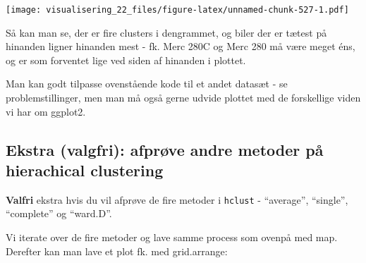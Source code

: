\documentclass[
]{book}
\newenvironment{Shaded}{\begin{snugshade}}{\end{snugshade}}
\newcommand{\AttributeTok}[1]{\textcolor[rgb]{0.77,0.63,0.00}{#1}}
\newcommand{\CommentTok}[1]{\textcolor[rgb]{0.56,0.35,0.01}{\textit{#1}}}
\newcommand{\DecValTok}[1]{\textcolor[rgb]{0.00,0.00,0.81}{#1}}
\newcommand{\ErrorTok}[1]{\textcolor[rgb]{0.64,0.00,0.00}{\textbf{#1}}}
\newcommand{\FunctionTok}[1]{\textcolor[rgb]{0.00,0.00,0.00}{#1}}
\newcommand{\NormalTok}[1]{#1}
\newcommand{\OtherTok}[1]{\textcolor[rgb]{0.56,0.35,0.01}{#1}}
\newcommand{\SpecialCharTok}[1]{\textcolor[rgb]{0.00,0.00,0.00}{#1}}
\begin{document}
\texttt{[image: visualisering\_22\_files/figure-latex/unnamed-chunk-527-1.pdf]}

Så kan man se, der er fire clusters i dengrammet, og biler der er tætest på hinanden ligner hinanden mest - fk. Merc 280C og Merc 280 må være meget éns, og er som forventet lige ved siden af hinanden i plottet.

Man kan godt tilpasse ovenstående kode til et andet datasæt - se problemstillinger, men man må også gerne udvide plottet med de forskellige viden vi har om ggplot2.

\hypertarget{ekstra-valgfri-afpruxf8ve-andre-metoder-puxe5-hierachical-clustering}{%
\subsection{Ekstra (valgfri): afprøve andre metoder på hierachical clustering}\label{ekstra-valgfri-afpruxf8ve-andre-metoder-puxe5-hierachical-clustering}}

\textbf{Valfri} ekstra hvis du vil afprøve de fire metoder i \texttt{hclust} - ``average'', ``single'', ``complete'' og ``ward.D''.

\begin{Shaded}
\end{Shaded}

Vi iterate over de fire metoder og lave samme process som ovenpå med map. Derefter kan man lave et plot fk. med grid.arrange:
\end{document}

